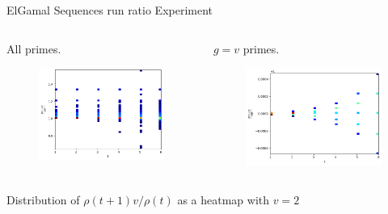 \begin{frame}{ElGamal Sequences run ratio Experiment}
    \begin{columns}
        \begin{column}{0.45\textwidth}
        \begin{center}
            All primes.
        \end{center}
            \begin{figure}
                \centering
                \includegraphics[width=\textwidth]{figures/v2Normalizedrunratio.png}
            \end{figure}
        \end{column}
        \begin{column}{0.45\textwidth}
        \begin{center}
            $g = v$ primes.
        \end{center}
            \begin{figure}
                \centering
                \includegraphics[width=\textwidth]{figures/v2AndvisGenNormalizedrunratio.png}
            \end{figure}
        \end{column}
    \end{columns}
    \begin{center}
                Distribution of $\rho(t+1)v/\rho(t)$ as a heatmap with $v = 2$
    \end{center}
\end{frame}
 	

